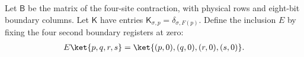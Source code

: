 \begin{definition}%
    \label{def:peps_kitaev_checkerboard_maps}
    \leanok
    Let $\mathsf B$ be the matrix of the four-site contraction, with
    physical rows and eight-bit boundary columns. Let $\mathsf K$ have
    entries $\mathsf K_{\sigma,p}=\delta_{\sigma,F(p)}$.
    Define the inclusion $E$ by fixing the four second boundary registers
    at zero:
    \begin{align}
        E\ket{p,q,r,s}=\ket{(p,0),(q,0),(r,0),(s,0)}.
    \end{align}
\end{definition}

